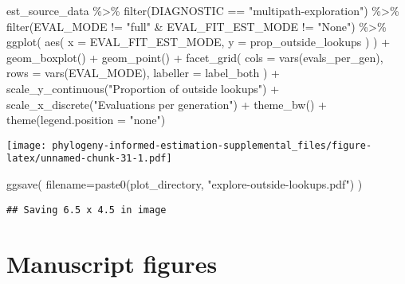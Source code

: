 \documentclass[
]{book}
\newenvironment{Shaded}{\begin{snugshade}}{\end{snugshade}}
\newcommand{\AttributeTok}[1]{\textcolor[rgb]{0.77,0.63,0.00}{#1}}
\newcommand{\FunctionTok}[1]{\textcolor[rgb]{0.00,0.00,0.00}{#1}}
\newcommand{\NormalTok}[1]{#1}
\newcommand{\SpecialCharTok}[1]{\textcolor[rgb]{0.00,0.00,0.00}{#1}}
\newcommand{\StringTok}[1]{\textcolor[rgb]{0.31,0.60,0.02}{#1}}
\begin{document}
\begin{Shaded}
\begin{Highlighting}[]
\NormalTok{est\_source\_data }\SpecialCharTok{\%\textgreater{}\%}
  \FunctionTok{filter}\NormalTok{(DIAGNOSTIC }\SpecialCharTok{==} \StringTok{"multipath{-}exploration"}\NormalTok{) }\SpecialCharTok{\%\textgreater{}\%}
  \FunctionTok{filter}\NormalTok{(EVAL\_MODE }\SpecialCharTok{!=} \StringTok{"full"} \SpecialCharTok{\&}\NormalTok{ EVAL\_FIT\_EST\_MODE }\SpecialCharTok{!=} \StringTok{"None"}\NormalTok{) }\SpecialCharTok{\%\textgreater{}\%}
  \FunctionTok{ggplot}\NormalTok{(}
      \FunctionTok{aes}\NormalTok{(}
        \AttributeTok{x =}\NormalTok{ EVAL\_FIT\_EST\_MODE,}
        \AttributeTok{y =}\NormalTok{ prop\_outside\_lookups}
\NormalTok{      )}
\NormalTok{    ) }\SpecialCharTok{+}
    \FunctionTok{geom\_boxplot}\NormalTok{() }\SpecialCharTok{+}
    \FunctionTok{geom\_point}\NormalTok{() }\SpecialCharTok{+}
    \FunctionTok{facet\_grid}\NormalTok{(}
      \AttributeTok{cols =} \FunctionTok{vars}\NormalTok{(evals\_per\_gen),}
      \AttributeTok{rows =} \FunctionTok{vars}\NormalTok{(EVAL\_MODE),}
      \AttributeTok{labeller =}\NormalTok{ label\_both}
\NormalTok{    ) }\SpecialCharTok{+}
    \FunctionTok{scale\_y\_continuous}\NormalTok{(}\StringTok{"Proportion of outside lookups"}\NormalTok{) }\SpecialCharTok{+}
    \FunctionTok{scale\_x\_discrete}\NormalTok{(}\StringTok{"Evaluations per generation"}\NormalTok{) }\SpecialCharTok{+}
    \FunctionTok{theme\_bw}\NormalTok{() }\SpecialCharTok{+}
    \FunctionTok{theme}\NormalTok{(}\AttributeTok{legend.position =} \StringTok{"none"}\NormalTok{)}
\end{Highlighting}
\end{Shaded}

\texttt{[image: phylogeny-informed-estimation-supplemental\_files/figure-latex/unnamed-chunk-31-1.pdf]}

\begin{Shaded}
\begin{Highlighting}[]
\FunctionTok{ggsave}\NormalTok{(}
   \AttributeTok{filename=}\FunctionTok{paste0}\NormalTok{(plot\_directory, }\StringTok{"explore{-}outside{-}lookups.pdf"}\NormalTok{)}
\NormalTok{)}
\end{Highlighting}
\end{Shaded}

\begin{verbatim}
## Saving 6.5 x 4.5 in image
\end{verbatim}

\hypertarget{manuscript-figures}{%
\section{Manuscript figures}\label{manuscript-figures}}
\end{document}
